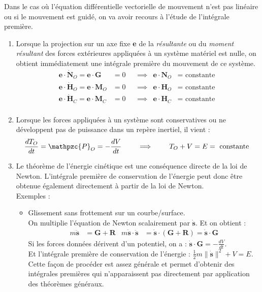 \documentclass[a4paper]{article}
\begin{document}
\begin{tcolorbox}[title=E. Courbe de guidage mobile, colback=white, colframe=orange, rounded corners]

Dans le cas où l'équation différentielle vectorielle de mouvement n'est pas linéaire ou si le mouvement est guidé, on va avoir recours à l'étude de l'intégrale première.
\begin{enumerate}
\item Lorsque la projection sur un axe fixe \textbf{e} de la \emph{résultante} ou du \emph{moment résultant} des forces extérieures appliquées à un système matériel est nulle, on obtient immédiatement une intégrale première du mouvement de ce système.
\begin{align*}
\textbf{e} \cdot \dot{\textbf{N}}_O = \textbf{e} \cdot \textbf{G} &= 0 &&\implies &\textbf{e} \cdot \textbf{N}_O &= \text{ constante } \\
\textbf{e} \cdot \dot{\textbf{H}}_O = \textbf{e} \cdot \textbf{M}_O &= 0 &&\implies &\textbf{e} \cdot \textbf{H}_O &= \text{ constante } \\
\textbf{e} \cdot \dot{\textbf{H}}_C = \textbf{e} \cdot \textbf{M}_C &= 0 &&\implies &\textbf{e} \cdot \textbf{H}_C &= \text{ constante } \\
\end{align*}
\item Lorsque les forces appliquées à un système sont conservatives ou ne développent pas de puissance dans un repère inertiel, il vient : 
\[ \frac{d T_O}{d t} = \mathpzc{P}_O = - \frac{d V}{d t} \qquad \implies \qquad T_O + V = E = \text{ constante } \]
\item Le théorème de l'énergie cinétique est une conséquence directe de la loi de Newton. L'intégrale première de conservation de l'énergie peut donc être obtenue également directement à partir de la loi de Newton. \\
Exemples : 
\begin{itemize}
    \item Glissement sans frottement sur un courbe/surface. \\
    On multiplie l'équation de Newton scalairement par $ \dot{\textbf{s}} $. Et on obtient : 
    \begin{align*} m \ddot{\textbf{s}} &= \textbf{G} + \textbf{R} &m \dot{\textbf{s}} \cdot \ddot{\textbf{s}} &= \dot{\textbf{s}} \cdot (\textbf{G} + \textbf{R}) = \dot{\textbf{s}} \cdot \textbf{G} \end{align*}
    Si les forces données dérivent d'un potentiel, on a : $\displaystyle \dot{\textbf{s}} \cdot \textbf{G} = - \frac{d V}{d t} $. \\
    Et l'intégrale première de conservation de l'énergie : $\displaystyle \frac{1}{2} m \| \dot{\textbf{s}} \|^2 + V = E $. \\
    Cette façon de procéder est assez générale et permet d'obtenir des intégrales premières qui n'apparaissent pas directement par application des théorèmes généraux.


\end{itemize}
\end{enumerate}
\end{tcolorbox}
\end{document}
